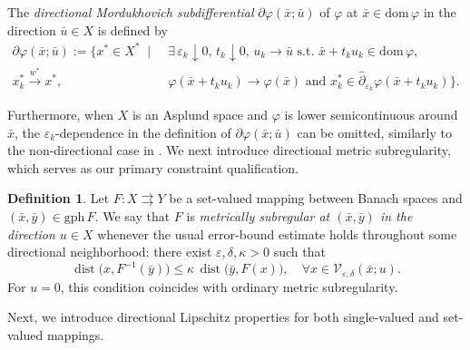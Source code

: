 \documentclass[12pt,twoside,reqno]{amsart}
\theoremstyle{definition}
\newtheorem{definition}[theorem]{Definition}
\numberwithin{equation}{section}
\begin{document}
The \emph{directional Mordukhovich subdifferential} $\partial \varphi(\bar{x}; \bar{u})$ of $\varphi$ at $\bar{x} \in \mathrm{dom}\, \varphi$ in the direction $\bar{u} \in X$ is defined by
\begin{equation} \label{defn:dir_subdiff}
\begin{aligned}
    \partial \varphi(\bar{x}; \bar{u}) := \big\{ x^* \in X^* \;\mid\; &\exists\, \varepsilon_k \downarrow 0, \, t_k \downarrow 0, \, u_k \to \bar{u} \text{ s.t. } \bar{x} + t_k u_k \in \mathrm{dom}\,\varphi,  \\
    x_k^* \xrightarrow{w^*} x^*, \, &\varphi(\bar{x} + t_k u_k) \to \varphi(\bar{x}) \text{ and } x_k^* \in \widehat{\partial}_{\varepsilon_k}\varphi(\bar{x} + t_k u_k) \big\}.
\end{aligned}
\end{equation}

Furthermore, when $X$ is an Asplund space and $\varphi$ is lower semicontinuous around $\bar{x}$, the $\varepsilon_k$-dependence in the definition of $\partial \varphi(\bar{x}; \bar{u})$ can be omitted, similarly to the non-directional case in \cite[Theorem~2.34]{Mordukhovich2006variational}. 
We next introduce directional metric subregularity, which serves as our primary constraint qualification.

\begin{definition}\label{defn:directional_metric_subregularity}
    Let $F:X\rightrightarrows Y$ be a set-valued mapping between Banach spaces and $(\bar{x},\bar{y})\in\mathrm{gph}\,F$. We say that $F$ is \emph{metrically subregular at $(\bar{x},\bar{y})$ in the direction $u\in X$} whenever the usual error-bound estimate holds throughout some directional neighborhood: there exist $\varepsilon,\delta,\kappa>0$ such that
    \begin{equation} \label{eq:directional_ms}
        \operatorname{dist}\big(x, F^{-1}(\bar{y})\big) \leq \kappa \, \operatorname{dist}\big(\bar{y}, F(x)\big), \quad \forall x \in \mathcal{V}_{\varepsilon,\delta}(\bar{x}; u).
    \end{equation}
For $u=0$, this condition coincides with ordinary metric subregularity. 
\end{definition}

Next, we introduce directional Lipschitz properties for both single-valued and set-valued mappings. 
\end{document}
